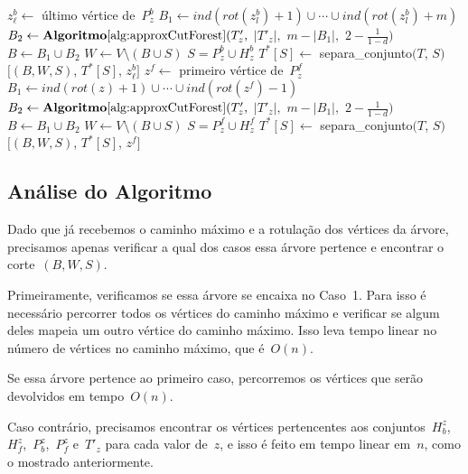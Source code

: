 	\LinesNumberedHidden
	\begin{algorithm}[H]
	\Numberline
		{
			\Numberline$z^b_\ell \gets $ último vértice de~$P_z^b$\;
			\Numberline$B_1 \gets ind(rot(z^b_l)+1)\cup\cdots\cup ind(rot(z^b_l)+m)$\;
			\Numberline$B_2 \gets \mathbf {Algoritmo\ref{alg:approxCutForest}}(T'_z,$ $|T'_z|,$ $m-|B_1|,$ $2-\frac{1}{1-d})$\;
			\Numberline$B \gets B_1\cup B_2$\;
			\Numberline$W \gets V\setminus (B\cup S)$\; 
			\Numberline$S = P_z^b\cup H^b_z $\;
			\Numberline$T^*[S]\gets $ {\sc separa\_conjunto}$(T$, $S)$\;
			\Numberline\Return $[(B,W,S)$, $T^*[S]$, $z^b_\ell]$\;
		}
		\Numberline
		\Else
		{
			\Numberline$z^f \gets $ primeiro vértice de~$P_z^f$\;
			\Numberline$B_1 \gets ind(rot(z)+1)\cup\cdots\cup ind(rot(z^f)-1)$\;
			\Numberline$B_2 \gets \mathbf {Algoritmo\ref{alg:approxCutForest}}(T'_z,$ $|T'_z|,$ $m-|B_1|,$ $2-\frac{1}{1-d})$\;
			\Numberline$B \gets B_1\cup B_2$\;
			\Numberline$W \gets V\setminus (B\cup S)$\; 
			\Numberline$S = P_z^f\cup H^f_z $\;
			\Numberline$T^*[S]\gets $ {\sc separa\_conjunto}$(T$, $S)$\;
			\Numberline\Return $[(B,W,S)$, $T^*[S]$, $z^f]$\;		
		}
	\end{algorithm}	
	\LinesNumbered
	\bigskip
	\bigskip
	\subsection*{Análise do Algoritmo}
	Dado que já recebemos o caminho máximo e a rotulação dos vértices
	da árvore, precisamos apenas verificar a qual dos casos essa árvore
	pertence e encontrar o corte~$(B,W,S)$.

	Primeiramente, verificamos se essa árvore se encaixa no Caso~1.
	Para isso é necessário percorrer todos os vértices do caminho máximo
	e verificar se algum deles mapeia um outro vértice do caminho máximo.
	Isso leva tempo linear no número de vértices no caminho máximo, que
	é~$O(n)$.

	Se essa árvore pertence ao primeiro caso, percorremos os vértices que
	serão devolvidos em tempo~$O(n)$.

	Caso contrário, precisamos encontrar os vértices pertencentes aos 
	conjuntos~$H_b^z$,~$H_f^z$,~$P_b^z$,~$P_f^z$ e~$T'_z$
	para cada valor de~$z$,
	e isso é feito em tempo linear em~$n$, como o mostrado anteriormente.


